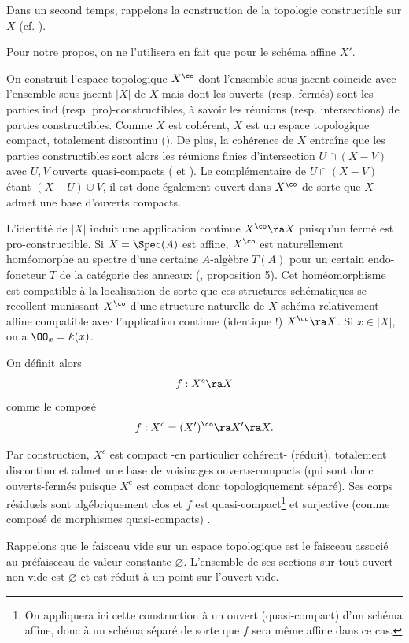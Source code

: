 \documentclass[10pt]{../fichiers-configuration-latex/smfart}
\begin{document}
Dans un second temps, rappelons la construction de la topologie constructible sur $X$ (cf.
).

\begin{remarque2} Pour notre propos, on ne l'utilisera en fait que pour le schéma affine
$X'$.\end{remarque2}

On construit l'espace topologique $X^{\co}$ dont l'ensemble sous-jacent coïncide avec l'ensemble
sous-jacent $|X|$  de $X$ mais dont les ouverts (resp. fermés) sont les parties ind (resp.
pro)-constructibles, à savoir les réunions (resp. intersections) de parties constructibles.  Comme
$X$ est cohérent, $X$ est un espace topologique compact, totalement discontinu
(). De plus, la cohérence de $X$ entraîne que les parties constructibles sont
alors les réunions finies d'intersection $U\cap(X-V)$ avec $U,V$ ouverts quasi-compacts
( et ). Le complémentaire de $U\cap(X-V)$ étant
$(X-U)\cup V$, il est donc également ouvert dans $X^{\co}$ de sorte que $X$ admet une base d'ouverts
compacts.

L'identité de $|X|$ induit une application continue $X^{\co}\ra X$ puisqu'un fermé est
pro-constructible. Si $X=\Spec(A)$ est affine, $X^{\co}$ est naturellement homéomorphe au spectre
d'une certaine $A$-algèbre $T(A)$ pour un certain endo-foncteur $T$ de la catégorie des anneaux
(\cite{Oli67}, proposition 5). Cet homéomorphisme est compatible à la localisation de sorte que ces
structures schématiques se recollent munissant $X^{\co}$ d'une structure naturelle de $X$-schéma
relativement affine compatible avec l'application continue (identique !) $X^{\co}\ra X$. Si $x\in
|X|$, on a $\OO_{x}=k(x)$.


On définit alors $$f:X^c\ra X$$ comme le composé $$f:X^c=(X')^{\co}\ra X'\ra X.$$

Par construction, $X^c$ est compact -en particulier cohérent- (réduit), totalement discontinu et
admet une base de voisinages ouverts-compacts (qui sont donc ouverts-fermés puisque $X^c$ est
compact donc topologiquement séparé).  Ses corps résiduels sont algébriquement clos et $f$ est
quasi-compact\footnote{On appliquera ici cette construction à un ouvert (quasi-compact) d'un schéma
affine, donc à un schéma séparé de sorte que $f$ sera même affine dans ce cas.} et surjective (comme
composé de morphismes quasi-compacts) .

Rappelons que le faisceau vide sur un espace topologique est le faisceau associé au préfaisceau de
valeur constante $\varnothing$.  L'ensemble de ses sections sur tout ouvert non vide est
$\varnothing$ et est réduit à un point sur l'ouvert vide.
\end{document}
